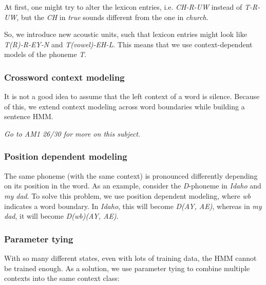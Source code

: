 \documentclass[11pt]{article}
\begin{document}
At first, one might try to alter the lexicon entries, i.e. \textit{CH-R-UW} instead of \textit{T-R-UW}, but the \textit{CH} in \textit{true} sounds different from the one in \textit{church}.

So, we introduce new acoustic units, such that lexicon entries might look like \textit{T(R)-R-EY-N} and \textit{T(vowel)-EH-L}. This means that we use context-dependent models of the phoneme \textit{T}.

\subsubsection{Crossword context modeling}

It is not a good idea to assume that the left context of a word is silence. Because of this, we extend context modeling across word boundaries while building a sentence HMM.

\textit{Go to AM1 26/30 for more on this subject.}

\subsubsection{Position dependent modeling}

The same phoneme (with the same context) is pronounced differently depending on its position in the word. As an example, consider the \textit{D}-phoneme in \textit{Idaho} and \textit{my dad}. To solve this problem, we use position dependent modeling, where \textit{wb} indicates a word boundary. In \textit{Idaho}, this will become \textit{D(AY, AE)}, whereas in \textit{my dad}, it will become \textit{D(wb)(AY, AE)}.

\subsubsection{Parameter tying}

With so many different states, even with lots of training data, the HMM cannot be trained enough. As a solution, we use parameter tying to combine multiple contexts into the same context class:
\end{document}
